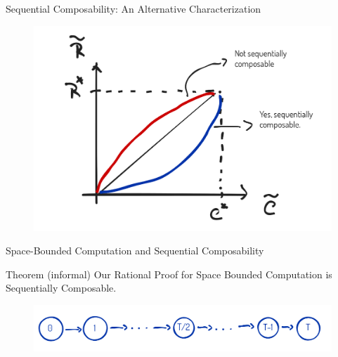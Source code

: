 \begin{frame}{Sequential Composability: An Alternative Characterization}
\begin{figure}
	\includegraphics[scale=0.27]{pics/sc-char.png}
\end{figure}
\end{frame}

\begin{frame}{Space-Bounded Computation and Sequential Composability}
\begin{block}{Theorem (informal)}
	Our Rational Proof for Space Bounded Computation is Sequentially Composable.
\end{block}
\bigskip
\begin{figure}
	\includegraphics[scale=0.3]{pics/space-protocol.png}
\end{figure}
\end{frame}


